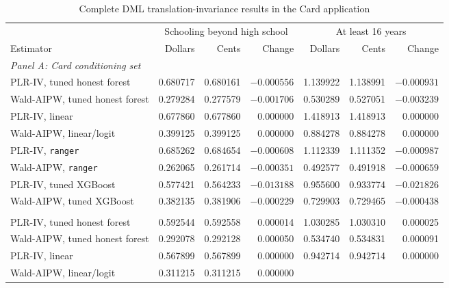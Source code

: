 \documentclass[12pt, a4paper, oneside]{article}
\theoremstyle{plain}
\theoremstyle{definition}
\begin{document}
\begin{table}[H]
\centering
\caption{Complete DML translation-invariance results in the Card application}
\label{tab:card_translation_dml_appendix}
\scriptsize
\setlength{\tabcolsep}{3.3pt}
\begin{threeparttable}
\begin{tabular}{@{}lrrr rrr@{}}
\toprule
& \multicolumn{3}{c}{Schooling beyond high school}
& \multicolumn{3}{c}{At least 16 years} \\
\cmidrule(lr){2-4}\cmidrule(lr){5-7}
Estimator
& Dollars & Cents & Change
& Dollars & Cents & Change \\
\midrule
\multicolumn{7}{l}{\textit{Panel A: Card conditioning set}} \\[2pt]
PLR-IV, tuned honest forest
& 0.680717 & 0.680161 & \textbf{$-0.000556$}
& 1.139922 & 1.138991 & \textbf{$-0.000931$} \\
Wald-AIPW, tuned honest forest
& 0.279284 & 0.277579 & \textbf{$-0.001706$}
& 0.530289 & 0.527051 & \textbf{$-0.003239$} \\
\addlinespace
PLR-IV, linear
& 0.677860 & 0.677860 & 0.000000
& 1.418913 & 1.418913 & 0.000000 \\
Wald-AIPW, linear/logit
& 0.399125 & 0.399125 & 0.000000
& 0.884278 & 0.884278 & 0.000000 \\
\addlinespace
PLR-IV, \texttt{ranger}
& 0.685262 & 0.684654 & \textbf{$-0.000608$}
& 1.112339 & 1.111352 & \textbf{$-0.000987$} \\
Wald-AIPW, \texttt{ranger}
& 0.262065 & 0.261714 & \textbf{$-0.000351$}
& 0.492577 & 0.491918 & \textbf{$-0.000659$} \\
\addlinespace
PLR-IV, tuned XGBoost
& 0.577421 & 0.564233 & \textbf{$-0.013188$}
& 0.955600 & 0.933774 & \textbf{$-0.021826$} \\
Wald-AIPW, tuned XGBoost
& 0.382135 & 0.381906 & \textbf{$-0.000229$}
& 0.729903 & 0.729465 & \textbf{$-0.000438$} \\
\addlinespace[4pt]
\multicolumn{7}{l}{\textit{Panel B: Kitagawa conditioning set}} \\[2pt]
PLR-IV, tuned honest forest
& 0.592544 & 0.592558 & 0.000014
& 1.030285 & 1.030310 & 0.000025 \\
Wald-AIPW, tuned honest forest
& 0.292078 & 0.292128 & 0.000050
& 0.534740 & 0.534831 & 0.000091 \\
\addlinespace
PLR-IV, linear
& 0.567899 & 0.567899 & 0.000000
& 0.942714 & 0.942714 & 0.000000 \\
Wald-AIPW, linear/logit
& 0.311215 & 0.311215 & 0.000000

\end{tabular}
\end{threeparttable}
\end{table}
\end{document}
